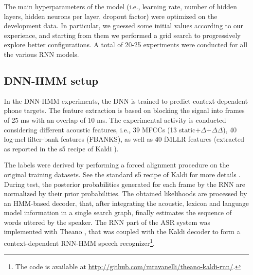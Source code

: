\documentclass[journal]{IEEEtran}
\begin{document}
The main hyperparameters of the model (i.e., learning rate, number of hidden layers, hidden neurons per layer, dropout factor) were optimized on the development data. 
In particular, we guessed some initial values according to our experience, and starting from them we performed a grid search to progressively explore better configurations. A total of 20-25 experiments were conducted for all the various RNN models.

\subsection{DNN-HMM setup} \label{sec:hmm_dnn}
In the DNN-HMM experiments, the DNN is trained to predict context-dependent phone targets. 
The feature extraction is based on blocking the signal into frames of 25 ms with an overlap of 10 ms.  The experimental activity is conducted considering different acoustic features, i.e., 39 MFCCs (13 static+$\Delta$+$\Delta\Delta$), 40 log-mel filter-bank features (FBANKS), as well as 40 fMLLR features (extracted as reported in the s5 recipe of Kaldi \cite{kaldi}).

The labels were derived by performing a forced alignment procedure on the original training datasets. See the standard s5 recipe of Kaldi for more details \cite{kaldi}.
During test, the posterior probabilities generated  for each frame by the RNN are normalized by their prior probabilities. 
The obtained likelihoods are processed by an HMM-based decoder, that, after integrating the acoustic, lexicon and language model information in a single search graph, finally estimates the sequence of words uttered  by the speaker.
The RNN part of the ASR system was implemented with Theano \cite{theano}, that was  coupled with the Kaldi decoder \cite{kaldi} to form a context-dependent RNN-HMM speech recognizer\footnote{The code is available at \url{http://github.com/mravanelli/theano-kaldi-rnn/}.}.
\end{document}
